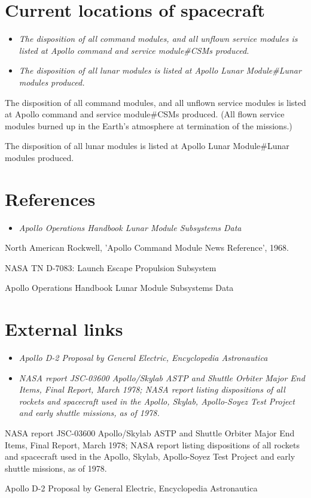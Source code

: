 \section{Current locations of
spacecraft}\label{current-locations-of-spacecraft}

\begin{itemize}
\item
  \emph{The disposition of all command modules, and all unflown service
  modules is listed at Apollo command and service module\#CSMs
  produced.}
\item
  \emph{The disposition of all lunar modules is listed at Apollo Lunar
  Module\#Lunar modules produced.}
\end{itemize}

The disposition of all command modules, and all unflown service modules
is listed at Apollo command and service module\#CSMs produced. (All
flown service modules burned up in the Earth's atmosphere at termination
of the missions.)

The disposition of all lunar modules is listed at Apollo Lunar
Module\#Lunar modules produced.

\section{References}\label{references}

\begin{itemize}
\item
  \emph{Apollo Operations Handbook Lunar Module Subsystems Data}
\end{itemize}

North American Rockwell, 'Apollo Command Module News Reference', 1968.

NASA TN D-7083: Launch Escape Propulsion Subsystem

Apollo Operations Handbook Lunar Module Subsystems Data

\section{External links}\label{external-links}

\begin{itemize}
\item
  \emph{Apollo D-2 Proposal by General Electric, Encyclopedia
  Astronautica}
\item
  \emph{NASA report JSC-03600 Apollo/Skylab ASTP and Shuttle Orbiter
  Major End Items, Final Report, March 1978; NASA report listing
  dispositions of all rockets and spacecraft used in the Apollo, Skylab,
  Apollo-Soyez Test Project and early shuttle missions, as of 1978.}
\end{itemize}

NASA report JSC-03600 Apollo/Skylab ASTP and Shuttle Orbiter Major End
Items, Final Report, March 1978; NASA report listing dispositions of all
rockets and spacecraft used in the Apollo, Skylab, Apollo-Soyez Test
Project and early shuttle missions, as of 1978.

Apollo D-2 Proposal by General Electric, Encyclopedia Astronautica
